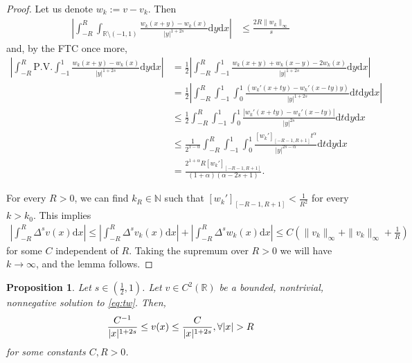 \documentclass[11pt,a4paper]{amsart}
\newcommand{\R}{\mathbb{R}}
\newcommand{\PV}{\mathrm{P.V.}}
\newcommand{\N}{\mathbb{N}}
\newcommand{\dx}{\mathrm{d}x}
\newcommand{\dy}{\mathrm{d}y}
\newcommand{\dt}{\mathrm{d}t}
\newtheorem{prop}[thm]{Proposition}
\begin{document}
\begin{proof}
Let us denote $w_k := v-v_k$. Then
\begin{align*}
\left|\int_{-R}^R \int_{\R\setminus(-1,1)} \frac{w_k(x+y) - w_k(x)}{|y|^{1+2s}} \dy\dx \right| &\leq \frac{2R\|w_k\|_{\infty}}{s}
\end{align*}
and, by the FTC once more,
\begin{align*}
\left|\int_{-R}^R \PV \int_{-1}^{1} \frac{w_k(x+y) - w_k(x)}{|y|^{1+2s}} \dy\dx \right| &=   \frac12 \left|\int_{-R}^R  \int_{-1}^{1} \frac{w_k(x+y) + w_k(x-y) - 2w_k(x)}{|y|^{1+2s}} \dy\dx \right|\\
&=  \frac12 \left|\int_{-R}^R  \int_{-1}^{1} \int_0^1 \frac{(w_k'(x+ty) - w_k'(x-ty)y)}{|y|^{1+2s}} \dt \dy\dx \right|\\
&\leq \frac12 \int_{-R}^R  \int_{-1}^{1}\int_0^1 \frac{|w_k'(x+ty) - w_k'(x-ty)|}{|y|^{2s}} \dt\dy\dx \\
&\leq \frac1{2^{1-\alpha}} \int_{-R}^R  \int_{-1}^{1}\int_0^1 \frac{[w_k']_{[-R-1, R+1]} t^{\alpha}}{|y|^{2s-\alpha}} \dt\dy\dx \\
&= \frac{2^{1+\alpha}R[w_k']_{[-R-1, R+1]}}{(1+\alpha)(\alpha-2s+1)}.
\end{align*}

For every $R>0$, we can find $k_R\in \N$ such that $[w_k']_{[-R-1, R+1]} < \frac1{R^2}$ for every $k>k_0$. This implies
\begin{align*}
\left| \int_{-R}^R \Delta^s v(x) \dx \right| \leq \left| \int_{-R}^R \Delta^s v_k(x) \dx \right| + \left| \int_{-R}^R \Delta^s w_k(x) \dx \right| \leq C\left(\|v_k\|_{\infty} + \|v_k\|_{\infty} + \frac{1}{R}\right)
\end{align*}
for some $C$ independent of $R$. Taking the supremum over $R>0$ we will have $k\rightarrow \infty$, and the lemma follows.
\end{proof}

\begin{prop}
\label{prop:decay}
Let $s \in (\frac12, 1)$. Let $v\in C^2(\R)$ be a bounded, nontrivial, nonnegative solution to \eqref{eq:tw}. Then,
\begin{equation}
\label{eq:decay}
\frac{C^{-1}}{|x|^{1+2s}} \leq v(x) \leq \frac{C}{|x|^{1+2s}},\medskip \forall |x| > R
\end{equation}
for some constants $C, R > 0$.
\end{prop}
\end{document}
